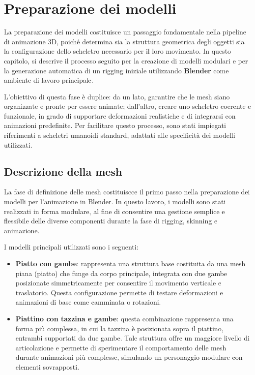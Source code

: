 \section{Preparazione dei modelli}

La preparazione dei modelli costituisce un passaggio fondamentale nella pipeline di animazione 3D, poiché determina sia la struttura geometrica degli oggetti sia la configurazione dello scheletro necessario per il loro movimento. In questo capitolo, si descrive il processo seguito per la creazione di modelli modulari e per la generazione automatica di un rigging iniziale utilizzando \textbf{Blender} come ambiente di lavoro principale.

L'obiettivo di questa fase è duplice: da un lato, garantire che le mesh siano organizzate e pronte per essere animate; dall'altro, creare uno scheletro coerente e funzionale, in grado di supportare deformazioni realistiche e di integrarsi con animazioni predefinite. Per facilitare questo processo, sono stati impiegati riferimenti a scheletri umanoidi standard, adattati alle specificità dei modelli utilizzati.

\subsection{Descrizione della mesh}

La fase di definizione delle mesh costituiscce il primo passo nella preparazione dei modelli per l'animazione in Blender. In questo lavoro, i modelli sono stati realizzati in forma modulare, al fine di consentire una gestione semplice e flessibile delle diverse componenti durante la fase di rigging, skinning e animazione.

I modelli principali utilizzati sono i seguenti: 
\begin{itemize}
    \item \textbf{Piatto con gambe}: rappresenta una struttura base costituita da una mesh piana (piatto) che funge da corpo principale, integrata con due gambe posizionate simmetricamente per consentire il movimento verticale e traslatorio. Questa configurazione permette di testare deformazioni e animazioni di base come camminata o rotazioni.
    \item \textbf{Piattino con tazzina e gambe}: questa combinazione rappresenta una forma più complessa, in cui la tazzina è posizionata sopra il piattino, entrambi supportati da due gambe. Tale struttura offre un maggiore livello di articolazione e permette di sperimentare il comportamento delle mesh durante animazioni più complesse, simulando un personaggio modulare con elementi sovrapposti.
\end{itemize}


